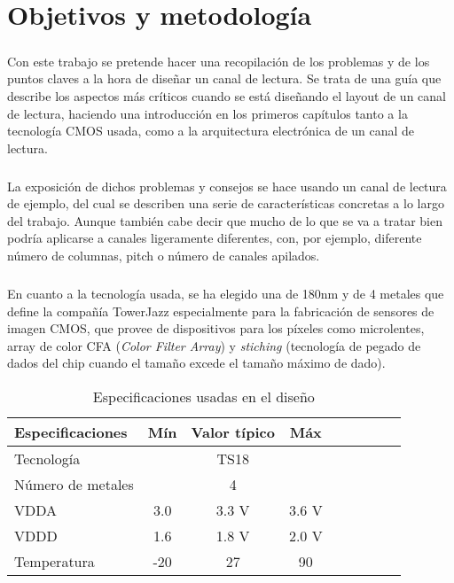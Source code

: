 \chapter*{Objetivos y metodología}
\label{cap:objetivos}

\paragraph{}
Con este trabajo se pretende hacer una recopilación de los problemas y de los
puntos claves a la hora de diseñar un canal de lectura. Se trata de una guía
que describe los aspectos más críticos cuando se está diseñando el layout de un
canal de lectura, haciendo una introducción en los primeros capítulos tanto a
la tecnología CMOS usada, como a la arquitectura electrónica de un canal de lectura.

\paragraph{}
La exposición de dichos problemas y consejos se hace usando un canal de lectura
de ejemplo, del cual se describen una serie de características concretas a lo
largo del trabajo. Aunque también cabe decir que mucho de lo que se va a tratar
bien podría aplicarse a canales ligeramente diferentes, con, por ejemplo,
diferente número de columnas, pitch o número de canales apilados.

\paragraph{}
En cuanto a la tecnología usada, se ha elegido una de 180nm y de 4 metales que
define la compañía TowerJazz\textsuperscript{\textregistered} especialmente para la fabricación de
sensores de imagen CMOS\cite{TowerJazz}, que provee de dispositivos para los
píxeles como microlentes, array de color CFA (\textit{Color Filter Array}) y \textit{stiching}
(tecnología de pegado de dados del chip cuando el tamaño excede el tamaño máximo
de dado).

\begin{table}[h]
	\centering
	\caption{Especificaciones usadas en el diseño}
	\label{table:specifications}
	\begin{tabular}{l*{7}{c}r}
		\hline
		Especificaciones	& Mín & Valor típico & Máx \\
		\hline
		Tecnología		&  & TS18 & \\
		Número de metales	&  & 4 & \\
		VDDA			& 3.0 & 3.3 V & 3.6 V \\
		VDDD 			& 1.6 & 1.8 V & 2.0 V \\
		Temperatura		& -20\centigrade & 27\centigrade & 90\centigrade \\
		\hline
	\end{tabular}
\end{table}

